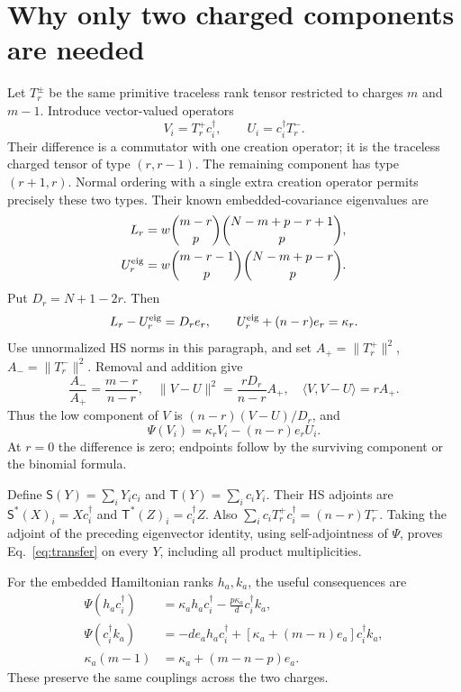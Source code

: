 \documentclass[11pt,a4paper]{article}
\begin{document}
\newpage
\section{Why only two charged components are needed}
Let $T_r^\pm$ be the same primitive traceless rank tensor restricted
to charges $m$ and $m-1$. Introduce vector-valued operators
\begin{equation}
 V_i=T_r^+c_i^\dagger,\qquad U_i=c_i^\dagger T_r^-.
\end{equation}
Their difference is a commutator with one creation operator; it is
the traceless charged tensor of type $(r,r-1)$. The remaining
component has type $(r+1,r)$. Normal ordering with a single extra
creation operator permits precisely these two types. Their known
embedded-covariance eigenvalues are
\begin{align}
 L_r&=w\binom{m-r}p\binom{N-m+p-r+1}p,\\
 U_r^{\rm eig}&=w\binom{m-r-1}p\binom{N-m+p-r}p.
\end{align}
Put $D_r=N+1-2r$. Then
\begin{equation}
 L_r-U_r^{\rm eig}=D_r e_r,\qquad
 U_r^{\rm eig}+(n-r)e_r=\kappa_r.
\end{equation}
Use unnormalized HS norms in this paragraph, and set
$A_+=\|T_r^+\|^2$, $A_-=\|T_r^-\|^2$. Removal and addition give
\begin{equation}
 \frac{A_-}{A_+}=\frac{m-r}{n-r},\quad
 \|V-U\|^2=\frac{rD_r}{n-r}A_+,\quad
 \langle V,V-U\rangle=rA_+.
\end{equation}
Thus the low component of $V$ is $(n-r)(V-U)/D_r$, and
\begin{equation}
 \Psi(V_i)=\kappa_r V_i-(n-r)e_rU_i.
\end{equation}
At $r=0$ the difference is zero; endpoints follow by the surviving
component or the binomial formula.

Define $\mathsf S(Y)=\sum_iY_ic_i$ and
$\mathsf T(Y)=\sum_i c_iY_i$. Their HS adjoints are
$\mathsf S^*(X)_i=Xc_i^\dagger$ and
$\mathsf T^*(Z)_i=c_i^\dagger Z$. Also
$\sum_i c_iT_r^+c_i^\dagger=(n-r)T_r^-$.
Taking the adjoint of the preceding eigenvector identity, using
self-adjointness of $\Psi$, proves Eq.~\eqref{eq:transfer} on every
$Y$, including all product multiplicities.

For the embedded Hamiltonian ranks $h_a,k_a$, the useful consequences
are
\begin{align}
 \Psi(h_ac_i^\dagger)&=\kappa_a h_ac_i^\dagger
                   -\frac{p\kappa_a}{d}c_i^\dagger k_a,\\
 \Psi(c_i^\dagger k_a)&=-de_a h_ac_i^\dagger
                   +[\kappa_a+(m-n)e_a]c_i^\dagger k_a,\\
 \kappa_a(m-1)&=\kappa_a+(m-n-p)e_a.
\end{align}
These preserve the same couplings across the two charges.
\end{document}
